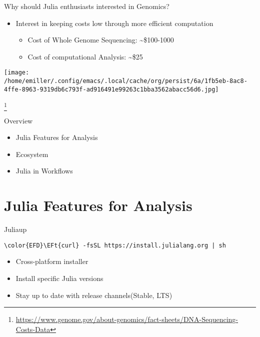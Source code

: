 \documentclass[bigger]{beamer}
\newcommand{\EFt}[1]{\textcolor{EFt}{#1}} %
\begin{document}
\begin{frame}[label={sec:orgbdc161b}]{Why should Julia enthusiasts interested in Genomics?}
\begin{itemize}
\item Interest in keeping costs low through more efficient computation
\begin{itemize}
\item Cost of Whole Genome Sequencing: \textasciitilde{}\$100-1000
\item Cost of computational Analysis: \textasciitilde{}\$25
\end{itemize}
\end{itemize}
\begin{center}
\texttt{[image: /home/emiller/.config/emacs/.local/cache/org/persist/6a/1fb5eb-8ac8-4ffe-8963-9319db6c793f-ad916491e99263c1bba3562abacc56d6.jpg]}
\end{center} \footnote{\url{https://www.genome.gov/about-genomics/fact-sheets/DNA-Sequencing-Costs-Data}}

\end{frame}

\begin{frame}[label={sec:org5cc9229}]{Overview}
\begin{itemize}
\item Julia Features for Analysis
\item Ecosystem
\item Julia in Workflows
\end{itemize}
\end{frame}

\section*{Julia Features for Analysis}
\label{sec:orgfab0678}
\begin{frame}[label={sec:org66ac1a9},fragile]{Juliaup}
 \begin{Code}
\begin{Verbatim}
\color{EFD}\EFt{curl} -fsSL https://install.julialang.org | sh
\end{Verbatim}
\end{Code}

\begin{itemize}
\item Cross-platform installer
\item Install specific Julia versions
\item Stay up to date with release channels(Stable, LTS)
\end{itemize}
\end{frame}
\end{document}
